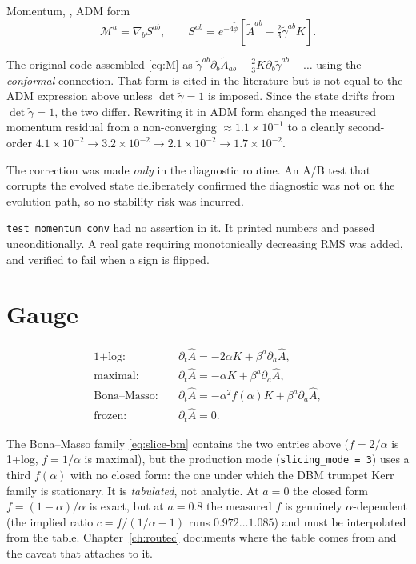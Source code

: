 \documentclass[11pt,openany]{book}
\newcommand{\ph}{\tilde{\phi}}
\newcommand{\At}{\tilde{A}}
\newcommand{\etr}{\tilde{\gamma}}
\newcommand{\etrT}{\tilde{\gamma}^{ab}}
\begin{document}
Momentum, , ADM form
\begin{equation}
\label{eq:M}
\mathcal{M}^a = \nabla_b S^{ab},
\qquad
S^{ab} = e^{-4\ph}\left[\At^{ab} - \tfrac{2}{3}\etr^{ab}K\right].
\end{equation}

\gotcha
The original code assembled \eqref{eq:M} as $\etrT\partial_b\At_{ab} -
\frac{2}{3}K\partial_b\etr^{ab} - \ldots$ using the \emph{conformal}
connection. That form is cited in the literature but is not equal to the ADM
expression above unless $\det\etr = 1$ is imposed. Since the state drifts from
$\det\etr = 1$, the two differ. Rewriting it in ADM form changed the measured
momentum residual from a non-converging $\approx 1.1\times10^{-1}$ to a
cleanly second-order $4.1\times10^{-2} \to 3.2\times10^{-2} \to 2.1\times10^{-2}
\to 1.7\times10^{-2}$.

The correction was made \emph{only} in the diagnostic routine. An A/B test that
corrupts the evolved state deliberately confirmed the diagnostic was not on the
evolution path, so no stability risk was incurred.

\gotcha
\texttt{test\_momentum\_conv} had no assertion in it. It printed numbers and
passed unconditionally. A real gate requiring monotonically decreasing RMS was
added, and verified to fail when a sign is flipped.

\section{Gauge}
\label{sec:gauge}

\begin{align}
\text{1+log:} \quad &\partial_t\hat{A}
  = -2\alpha K + \beta^a\partial_a\hat{A},
  \label{eq:slice-log}\\
\text{maximal:} \quad &\partial_t\hat{A}
  = -\alpha K + \beta^a\partial_a\hat{A},
  \label{eq:slice-max}\\
\text{Bona--Masso:} \quad &\partial_t\hat{A}
  = -\alpha^2 f(\alpha) K + \beta^a\partial_a\hat{A},
  \label{eq:slice-bm}\\
\text{frozen:} \quad &\partial_t\hat{A} = 0.
  \label{eq:slice-frozen}
\end{align}

The Bona--Masso family \eqref{eq:slice-bm} contains the two entries above
($f = 2/\alpha$ is 1+log, $f = 1/\alpha$ is maximal), but the production
mode (\texttt{slicing\_mode = 3}) uses a third $f(\alpha)$ with no closed
form: the one under which the DBM trumpet Kerr family is stationary. It is
\emph{tabulated}, not analytic. At $a = 0$ the closed form
$f = (1-\alpha)/\alpha$ is exact, but at $a = 0.8$ the measured $f$ is
genuinely $\alpha$-dependent (the implied ratio $c = f/(1/\alpha - 1)$ runs
$0.972 \ldots 1.085$) and must be interpolated from the table.
Chapter~\ref{ch:routec} documents where the table comes from and the caveat
that attaches to it.
\end{document}
